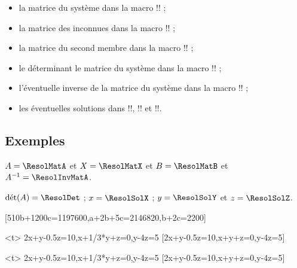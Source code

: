 \documentclass[french,a4paper,11pt]{article}
\begin{document}
{{\begin{tipblock}
\begin{itemize}
	\item la matrice du système dans la macro \motcletex!\ResolMatA! ;
	\item la matrice des inconnues dans la macro \motcletex!\ResolMatX! ;
	\item la matrice du second membre dans la macro \motcletex!\ResolMatB! ;
	\item le déterminant le matrice du système dans la macro \motcletex!\ResolDet! ;
	\item l'éventuelle inverse de la matrice du système dans la macro \motcletex!\ResolInvMatA! ;
	\item les éventuelles solutions dans \motcletex!\ResolSolX!, \motcletex!\ResolSolY! et \motcletex!\ResolSolZ!.
\end{itemize}
\vspace*{-\baselineskip}\leavevmode
\end{tipblock}

\subsection{Exemples}

\begin{DemoCode}[]

$A=\ResolMatA$ et $X=\ResolMatX$ et $B=\ResolMatB$ et $A^{-1}=\ResolInvMatA$.

$\text{dét}(A)=\ResolDet$ ; $x=\ResolSolX$ ; $y=\ResolSolY$ et $z=\ResolSolZ$.
\end{DemoCode}

\begin{DemoCode}[]
%
	[510b+{\num{1200}}c={\num{1197600}},a+2b+5c={\num{2146820}},b+2c={\num{2200}}]%
\end{DemoCode}

\begin{DemoCode}[]
\ResolSystemeMatrices<t>%
	{2x+y-0.5z=10,x+1/3*y+z=0,y-4z=5}%
	[2x+y-{\num{0.5}}z=10,x+{}y+z=0,y-4z=5]%
\end{DemoCode}

\begin{DemoCode}[]
\ResolSystemeMatrices[Enonce=false]<t>%
	{2x+y-0.5z=10,x+1/3*y+z=0,y-4z=5}%
	[2x+y-{\num{0.5}}z=10,x+{}y+z=0,y-4z=5]%
\end{DemoCode}

}}
\end{document}
